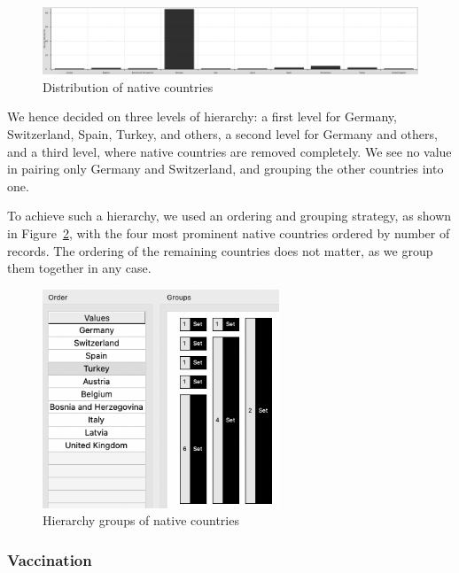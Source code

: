 \documentclass[parskip=half]{scrartcl}
\newcommand\figref{Figure~\ref}
\begin{document}
\begin{figure}[ht]
    \begin{center}
        \includegraphics[width=\textwidth]{country_distribution}
        \caption{Distribution of native countries}
        \label{fig:country-distribution}
    \end{center}
\end{figure}

We hence decided on three levels of hierarchy: a first level for Germany,
Switzerland, Spain, Turkey, and others, a second level for Germany and others,
and a third level, where native countries are removed completely. We see no
value in pairing only Germany and Switzerland, and grouping the other countries
into one.

To achieve such a hierarchy, we used an ordering and grouping strategy, as
shown in \figref{fig:country-groups}, with the four most prominent native
countries ordered by number of records. The ordering of the remaining countries
does not matter, as we group them together in any case.

\begin{figure}[ht]
    \begin{center}
        \includegraphics[width=200pt]{country_groups}
        \caption{Hierarchy groups of native countries}
        \label{fig:country-groups}
    \end{center}
\end{figure}

\subsubsection{Vaccination}
\end{document}
